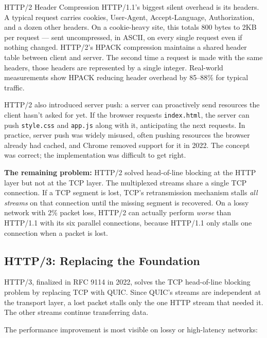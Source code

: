 \documentclass[11pt,a4paper]{article}
\begin{document}
\begin{industrybox}{HTTP/2 Header Compression}
HTTP/1.1's biggest silent overhead is its headers. A typical request carries cookies, User-Agent, Accept-Language, Authorization, and a dozen other headers. On a cookie-heavy site, this totals 800 bytes to 2KB per request --- sent uncompressed, in ASCII, on every single request even if nothing changed. HTTP/2's HPACK compression maintains a shared header table between client and server. The second time a request is made with the same headers, those headers are represented by a single integer. Real-world measurements show HPACK reducing header overhead by 85--88\% for typical traffic.
\end{industrybox}

HTTP/2 also introduced server push: a server can proactively send resources the client hasn't asked for yet. If the browser requests \texttt{index.html}, the server can push \texttt{style.css} and \texttt{app.js} along with it, anticipating the next requests. In practice, server push was widely misused, often pushing resources the browser already had cached, and Chrome removed support for it in 2022. The concept was correct; the implementation was difficult to get right.

\textbf{The remaining problem:} HTTP/2 solved head-of-line blocking at the HTTP layer but not at the TCP layer. The multiplexed streams share a single TCP connection. If a TCP segment is lost, TCP's retransmission mechanism stalls \emph{all streams} on that connection until the missing segment is recovered. On a lossy network with 2\% packet loss, HTTP/2 can actually perform \emph{worse} than HTTP/1.1 with its six parallel connections, because HTTP/1.1 only stalls one connection when a packet is lost.

\subsection{HTTP/3: Replacing the Foundation}

HTTP/3, finalized in RFC 9114 in 2022, solves the TCP head-of-line blocking problem by replacing TCP with QUIC. Since QUIC's streams are independent at the transport layer, a lost packet stalls only the one HTTP stream that needed it. The other streams continue transferring data.

The performance improvement is most visible on lossy or high-latency networks:
\end{document}
